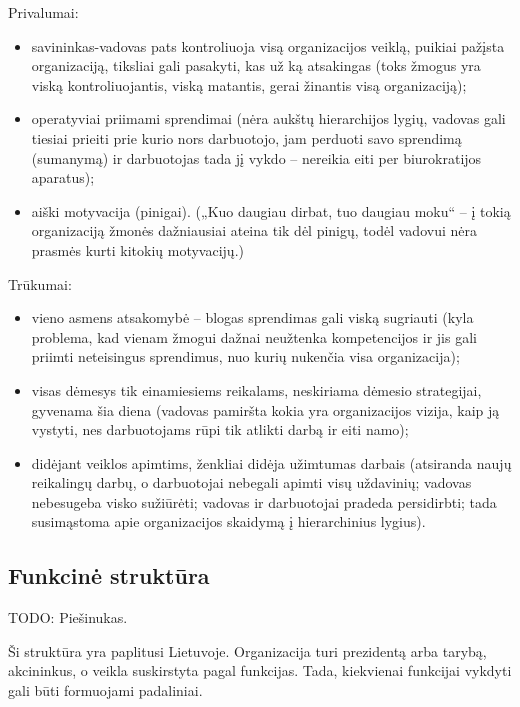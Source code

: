 Privalumai:
\begin{itemize}
  \item savininkas-vadovas pats kontroliuoja visą organizacijos veiklą,
    puikiai pažįsta organizaciją, tiksliai gali pasakyti, kas už ką
    atsakingas (toks žmogus yra viską kontroliuojantis, viską matantis,
    gerai žinantis visą organizaciją);
  \item operatyviai priimami sprendimai (nėra aukštų hierarchijos lygių,
    vadovas gali tiesiai prieiti prie kurio nors darbuotojo, jam
    perduoti savo sprendimą (sumanymą) ir darbuotojas tada jį vykdo –
    nereikia eiti per biurokratijos aparatus);
  \item aiški motyvacija (pinigai). („Kuo daugiau dirbat, tuo daugiau
    moku“ – į tokią organizaciją žmonės dažniausiai ateina tik dėl
    pinigų, todėl vadovui nėra prasmės kurti kitokių motyvacijų.)
\end{itemize}

Trūkumai:
\begin{itemize}
  \item vieno asmens atsakomybė – blogas sprendimas gali viską sugriauti
    (kyla problema, kad vienam žmogui dažnai neužtenka kompetencijos
    ir jis gali priimti neteisingus sprendimus, nuo kurių nukenčia
    visa organizacija);
  \item visas dėmesys tik einamiesiems reikalams, neskiriama dėmesio
    strategijai, gyvenama šia diena (vadovas pamiršta kokia yra
    organizacijos vizija, kaip ją vystyti, nes darbuotojams rūpi tik
    atlikti darbą ir eiti namo);
  \item didėjant veiklos apimtims, ženkliai didėja užimtumas darbais
    (atsiranda naujų reikalingų darbų, o darbuotojai nebegali apimti
    visų uždavinių; vadovas nebesugeba visko sužiūrėti; vadovas ir
    darbuotojai pradeda persidirbti; tada susimąstoma apie organizacijos
    skaidymą į hierarchinius lygius).
\end{itemize}

\subsection{Funkcinė struktūra}

TODO: Piešinukas.

Ši struktūra yra paplitusi Lietuvoje. Organizacija turi prezidentą arba
tarybą, akcininkus, o veikla suskirstyta pagal funkcijas. Tada,
kiekvienai funkcijai vykdyti gali būti formuojami padaliniai.

